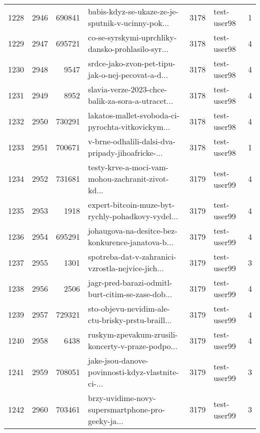\begin{tabular}{lrrlrlr}
1228 &       2946 &   690841 &  babis-kdyz-se-ukaze-ze-je-sputnik-v-ucinny-pok... &     3178 &                  test-user98 &               1 \\
1229 &       2947 &   695721 &  co-se-syrskymi-uprchliky-dansko-prohlasilo-syr... &     3178 &                  test-user98 &               4 \\
1230 &       2948 &     9547 &  srdce-jako-zvon-pet-tipu-jak-o-nej-pecovat-a-d... &     3178 &                  test-user98 &               4 \\
1231 &       2949 &     8952 &  slavia-verze-2023-chce-balik-za-sora-a-utracet... &     3178 &                  test-user98 &               4 \\
1232 &       2950 &   730291 &  lakatos-mallet-svoboda-ci-pyrochta-vitkovickym... &     3178 &                  test-user98 &               4 \\
1233 &       2951 &   700671 &  v-brne-odhalili-dalsi-dva-pripady-jihoafricke-... &     3178 &                  test-user98 &               1 \\
1234 &       2952 &   731681 &  testy-krve-a-moci-vam-mohou-zachranit-zivot-kd... &     3179 &                  test-user99 &               4 \\
1235 &       2953 &     1918 &  expert-bitcoin-muze-byt-rychly-pohadkovy-vydel... &     3179 &                  test-user99 &               4 \\
1236 &       2954 &   695291 &  johaugova-na-desitce-bez-konkurence-janatova-b... &     3179 &                  test-user99 &               4 \\
1237 &       2955 &     1301 &  spotreba-dat-v-zahranici-vzrostla-nejvice-jich... &     3179 &                  test-user99 &               3 \\
1238 &       2956 &     2506 &  jagr-pred-barazi-odmitl-burt-citim-se-zase-dob... &     3179 &                  test-user99 &               4 \\
1239 &       2957 &   729321 &  sto-objevu-nevidim-ale-ctu-brisky-prstu-braill... &     3179 &                  test-user99 &               4 \\
1240 &       2958 &     6438 &  ruskym-zpevakum-zrusili-koncerty-v-praze-podpo... &     3179 &                  test-user99 &               4 \\
1241 &       2959 &   708051 &  jake-jsou-danove-povinnosti-kdyz-vlastnite-ci-... &     3179 &                  test-user99 &               3 \\
1242 &       2960 &   703461 &  brzy-uvidime-novy-supersmartphone-pro-geeky-ja... &     3179 &                  test-user99 &               3 \\

\end{tabular}
